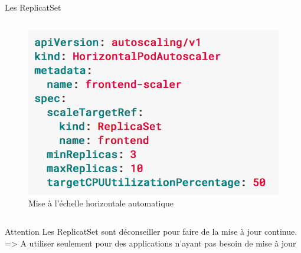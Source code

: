 \documentclass{bredelebeamer}
\begin{document}
\begin{frame}{Les ReplicatSet}
\begin{columns}
\begin{column}{0.5\textwidth}
\begin{figure}
\centering
\includegraphics[scale=0.4]{images/img17.png}
\caption{Mise à l'échelle horizontale automatique}
\end{figure}
\end{column}
\end{columns}

\begin{alertblock}{Attention}
Les ReplicatSet sont déconseiller pour faire de la mise à jour continue. \\
=> A utiliser seulement pour des applications n'ayant pas besoin de mise à jour
\end{alertblock}
\end{frame}
\end{document}

